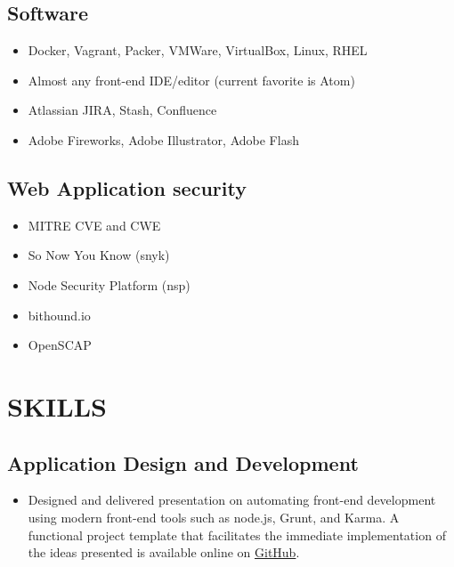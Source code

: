 \documentclass[10pt]{article}
\begin{document}
\subsection{Software}\label{software}

\begin{itemize}
\itemsep1pt\parskip0pt
\item
  Docker, Vagrant, Packer, VMWare, VirtualBox, Linux, RHEL
\item
  Almost any front-end IDE/editor (current favorite is Atom)
\item
  Atlassian JIRA, Stash, Confluence
\item
  Adobe Fireworks, Adobe Illustrator, Adobe Flash
\end{itemize}

\subsection{Web Application security}\label{web-application-security}

\begin{itemize}
\itemsep1pt\parskip0pt
\item
  MITRE CVE and CWE
\item
  So Now You Know (snyk)
\item
  Node Security Platform (nsp)
\item
  bithound.io
\item
  OpenSCAP
\end{itemize}

\section{SKILLS}\label{skills}

\subsection{Application Design and
Development}\label{application-design-and-development}

\begin{itemize}
\itemsep1pt\parskip0pt
\item
  Designed and delivered presentation on automating front-end
  development using modern front-end tools such as node.js, Grunt, and
  Karma. A functional project template that facilitates the immediate
  implementation of the ideas presented is available online on
  \href{https://github.com/jhwohlgemuth/generator-techtonic}{GitHub}.
\end{itemize}
\end{document}
